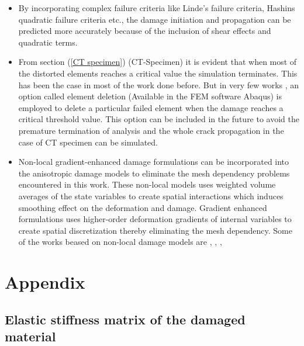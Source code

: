 \documentclass[12pt,openright,twoside]{report}
\newcounter{savepage}
\begin{document}
\begin{itemize}
\item By incorporating complex failure criteria like Linde's failure criteria, Hashins quadratic failure criteria \citep{jiang2018evaluations} etc., the damage initiation and propagation can be predicted more accurately because of the inclusion of shear effects and quadratic terms.

\item From section (\ref{CT specimen}) (CT-Specimen) it is evident that when most of the distorted elements reaches a critical value the simulation terminates. This has been the case in most of the work done before. But in very few works \citep{jiang2018evaluations}, \citep{sokolinsky2011numerical} an option called element deletion (Available in the FEM software Abaqus) is employed to delete a particular failed element when the damage reaches a critical threshold value. This option can be included in the future to avoid the premature termination of analysis and the whole crack propagation in the case of CT specimen can be simulated. 
\item Non-local gradient-enhanced damage formulations can be incorporated into the anisotropic damage models to eliminate the mesh dependency problems encountered in this work.  These non-local models uses weighted volume averages of the state variables to create spatial interactions which induces smoothing effect on the deformation and damage.  Gradient enhanced formulations uses higher-order deformation gradients of internal variables to create spatial discretization thereby eliminating the mesh dependency. Some of the works beased on non-local damage models are \citep{peerlings1999enhanced}, \citep{fassin2019gradient}, \citep{geers1998experimental}, \citep{seupel2018efficient}

\end{itemize}





\clearpage




\clearpage
\chapter*{Appendix}
\renewcommand{\thesection}{\Alph{section}.\arabic{section}}
\setcounter{page}{\thesavepage}
\section{Elastic stiffness matrix of the damaged material}
\end{document}
